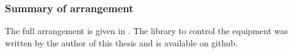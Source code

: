 



\subsubsection{Summary of arrangement}
The full arrangement is given in .
The library to control the equipment was written by the author of this thesis 
and is  available on github\cite{ExperimentCode}.









